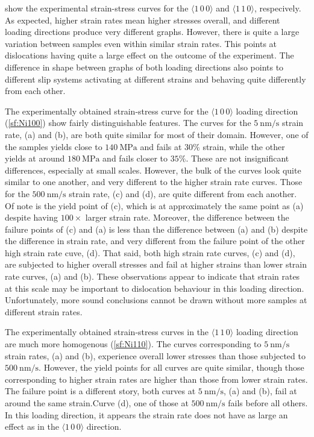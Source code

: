  show the experimental strain-stress curves for the $\langle 1\,0\,0 \rangle$ and $\langle 1\,1\,0 \rangle$, respecively. As expected, higher strain rates mean higher stresses overall, and different loading directions produce very different graphs. However, there is quite a large variation between samples even within similar strain rates. This points at dislocations having quite a large effect on the outcome of the experiment. The difference in shape between graphs of both loading directions also points to different slip systems activating at different strains and behaving quite differently from each other.

The experimentally obtained strain-stress curve for the $\langle 1\,0\,0 \rangle$ loading direction (\cref{sf:Ni100}) show fairly distinguishable features. The curves for the $\SI{5}{\nano\meter\per\second}$ strain rate, (a) and (b), are both quite similar for most of their domain. However, one of the samples yields close to $\SI{140}{\mega\pascal}$ and fails at $30\%$ strain, while the other yields at around $\SI{180}{\mega\pascal}$ and fails closer to $35\%$. These are not insignificant differences, especially at small scales. However, the bulk of the curves look quite similar to one another, and very different to the higher strain rate curves. Those for the $\SI{500}{\nano\metre\per\second}$ strain rate, (c) and (d), are quite different from each another. Of note is the yield point of (c), which is at approximately the same point as (a) despite having $100\times$ larger strain rate. Moreover, the difference between the failure points of (c) and (a) is less than the difference between (a) and (b) despite the difference in strain rate, and very different from the failure point of the other high strain rate cuve, (d). That said, both high strain rate curves, (c) and (d), are subjected to higher overall stresses and fail at higher strains than lower strain rate curves, (a) and (b). These observations appear to indicate that strain rates at this scale may be important to dislocation behaviour in this loading direction. Unfortunately, more sound conclusions cannot be drawn without more samples at different strain rates.

The experimentally obtained strain-stress curves in the $\langle 1\,1\,0\rangle$ loading direction are much more homogenous (\cref{sf:Ni110}). The curves corresponding to $\SI{5}{\nano\metre\per\second}$ strain rates, (a) and (b), experience overall lower stresses than those subjected to $\SI{500}{\nano\metre\per\second}$. However, the yield points for all curves are quite similar, though those corresponding to higher strain rates are higher than those from lower strain rates. The failure point is a different story, both curves at $\SI{5}{\nano\metre\per\second}$, (a) and (b), fail at around the same strain.Curve (d), one of those at $\SI{500}{\nano\metre\per\second}$ fails before all others. In this loading direction, it appears the strain rate does not have as large an effect as in the $\langle 1\,0\,0 \rangle$ direction.

